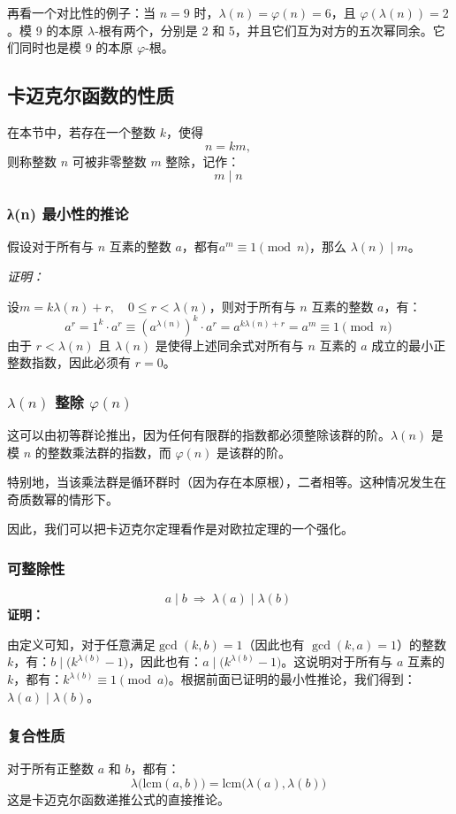 再看一个对比性的例子：当 $n = 9$ 时，$\lambda(n) = \varphi(n) = 6$，且 $\varphi(\lambda(n)) = 2$。模 9 的本原 $\lambda$-根有两个，分别是 2 和 5，并且它们互为对方的五次幂同余。它们同时也是模 9 的本原 $\varphi$-根。
\subsection{卡迈克尔函数的性质}
在本节中，若存在一个整数 $k$，使得
$$
n = k m,~
$$
则称整数 $n$ 可被非零整数 $m$ 整除，记作：
$$
m \mid n~
$$
\subsubsection{λ(n) 最小性的推论}
假设对于所有与 $n$ 互素的整数 $a$，都有$a^{m} \equiv 1 \pmod{n}$，那么 $\lambda(n) \mid m$。

\textsl{证明：}

设$m = k \lambda(n) + r, \quad 0 \le r < \lambda(n)$，则对于所有与 $n$ 互素的整数 $a$，有：
$$
a^{r} = 1^{k} \cdot a^{r} \equiv \left(a^{\lambda(n)}\right)^{k} \cdot a^{r} = a^{k\lambda(n) + r} = a^{m} \equiv 1 \pmod{n}~
$$
由于 $r < \lambda(n)$ 且 $\lambda(n)$ 是使得上述同余式对所有与 $n$ 互素的 $a$ 成立的最小正整数指数，因此必须有 $r = 0$。
\subsubsection{$\lambda(n)$ 整除 $\varphi(n)$}
这可以由初等群论推出，因为任何有限群的指数都必须整除该群的阶。$\lambda(n)$ 是模 $n$ 的整数乘法群的指数，而 $\varphi(n)$ 是该群的阶。

特别地，当该乘法群是循环群时（因为存在本原根），二者相等。这种情况发生在奇质数幂的情形下。

因此，我们可以把卡迈克尔定理看作是对欧拉定理的一个强化。
\subsubsection{可整除性}
$$
a \mid b \ \Rightarrow \ \lambda(a) \mid \lambda(b)~
$$
\textbf{证明：}

由定义可知，对于任意满足$\gcd(k, b) = 1$（因此也有 $\gcd(k, a) = 1$）的整数 $k$，有：$b \mid \bigl(k^{\lambda(b)} - 1\bigr)$，因此也有：$a \mid \bigl(k^{\lambda(b)} - 1\bigr)$。这说明对于所有与 $a$ 互素的 $k$，都有：$k^{\lambda(b)} \equiv 1 \pmod{a}$。根据前面已证明的最小性推论，我们得到：$
\lambda(a) \mid \lambda(b)$。
\subsubsection{复合性质}
对于所有正整数 $a$ 和 $b$，都有：
$$
\lambda\bigl(\mathrm{lcm}(a, b)\bigr) = \mathrm{lcm}\bigl(\lambda(a), \lambda(b)\bigr)~
$$
这是卡迈克尔函数递推公式的直接推论。
